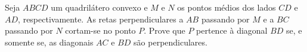 Seja $ABCD$ um quadrilátero convexo e $M$ e $N$ os pontos médios dos lados $CD$ e $AD$, respectivamente.
As retas perpendiculares a $AB$ passando por $M$ e a $BC$ passando por $N$ cortam-se no ponto $P$.
Prove que $P$ pertence à diagonal $BD$ se, e somente se, as diagonais $AC$ e $BD$ são perpendiculares.
